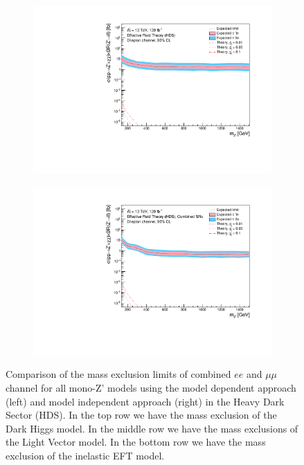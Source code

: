 \documentclass[12pt, a4paper]{book}
\begin{document}
\begin{figure}[!ht]
\begin{subfigure}[b]{0.49\textwidth}
      \includegraphics[width=1\textwidth]{Limits/EFT_HDS/mass_exclusion_comb.pdf}
   \end{subfigure}
   \hfill
   \begin{subfigure}[b]{0.49\textwidth}
      \centering
      \includegraphics[width=1\textwidth]{Limits/Model_independent/EFT_HDS/mass_exclusion_comb.pdf}
   \end{subfigure}
   \caption[Comparison of mass exclusion limits of dilepton channel for all mono-Z' models using the model dependent and independent approach in the HDS]{Comparison of the mass exclusion limits of combined $ee$ and $\mu\mu$ channel for all mono-Z' models using the model dependent approach (left) and model independent approach (right) in the Heavy Dark Sector (HDS). 
   In the top row we have the mass exclusion of the Dark Higgs model. In the middle row we have the mass exclusions of the Light Vector model. In the bottom row we have the mass exclusion of the inelastic EFT model.
}
\end{figure}
\end{document}
